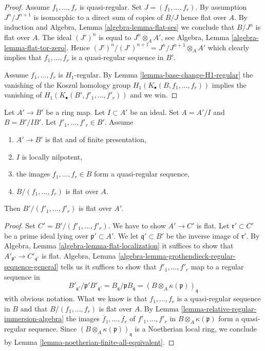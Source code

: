 \begin{proof}
Assume $f_1, \ldots, f_r$ is quasi-regular. Set $J = (f_1, \ldots, f_r)$.
By assumption $J^n/J^{n + 1}$ is isomorphic to a direct sum of copies of
$B/J$ hence flat over $A$. By induction and
Algebra, Lemma \ref{algebra-lemma-flat-ses}
we conclude that $B/J^n$ is flat over $A$. The ideal $(J')^n$ is equal to
$J^n \otimes_A A'$, see
Algebra, Lemma \ref{algebra-lemma-flat-tor-zero}.
Hence $(J')^n/(J')^{n + 1} = J^n/J^{n + 1} \otimes_A A'$ which clearly
implies that $f_1, \ldots, f_r$ is a quasi-regular sequence in $B'$.

\medskip\noindent
Assume $f_1, \ldots, f_r$ is $H_1$-regular. By
Lemma \ref{lemma-base-change-H1-regular}
the vanishing of the Koszul homology group
$H_1(K_\bullet(B, f_1, \ldots, f_r))$
implies the vanishing of $H_1(K_\bullet(B', f'_1, \ldots, f'_r))$
and we win.
\end{proof}

\begin{lemma}
\label{lemma-cut-by-koszul-flat}
Let $A' \to B'$ be a ring map. Let $I \subset A'$ be an ideal.
Set $A = A'/I$ and $B = B'/IB'$. Let $f'_1, \ldots, f'_r \in B'$. Assume
\begin{enumerate}
\item $A' \to B'$ is flat and of finite presentation,
\item $I$ is locally nilpotent,
\item the images $f_1, \ldots, f_r \in B$ form a quasi-regular sequence,
\item $B/(f_1, \ldots, f_r)$ is flat over $A$.
\end{enumerate}
Then $B'/(f'_1, \ldots, f'_r)$ is flat over $A'$.
\end{lemma}

\begin{proof}
Set $C' = B'/(f'_1, \ldots, f'_r)$. We have to show $A' \to C'$ is flat.
Let $\mathfrak r' \subset C'$ be a prime ideal lying over
$\mathfrak p' \subset A'$. We let $\mathfrak q' \subset B'$
be the inverse image of $\mathfrak r'$.
By Algebra, Lemma \ref{algebra-lemma-flat-localization}
it suffices to show that $A'_{\mathfrak p'} \to C'_{\mathfrak q'}$ is flat.
Algebra, Lemma \ref{algebra-lemma-grothendieck-regular-sequence-general}
tells us it suffices to show that $f'_1, \ldots, f'_r$ map to
a regular sequence in
$$
B'_{\mathfrak q'}/\mathfrak p'B'_{\mathfrak q'} =
B_\mathfrak q/\mathfrak p B_\mathfrak q =
(B \otimes_A \kappa(\mathfrak p))_\mathfrak q
$$
with obvious notation. What we know is that $f_1, \ldots, f_r$
is a quasi-regular sequence in $B$ and that $B/(f_1, \ldots, f_r)$
is flat over $A$. By Lemma \ref{lemma-relative-regular-immersion-algebra}
the images $\overline{f}_1, \ldots, \overline{f}_r$
of $f'_1, \ldots, f'_r$ in $B \otimes_A \kappa(\mathfrak p)$ form a
quasi-regular sequence. Since $(B \otimes_A \kappa(\mathfrak p))_\mathfrak q$
is a Noetherian local ring, we conclude by Lemma
\ref{lemma-noetherian-finite-all-equivalent}.
\end{proof}

